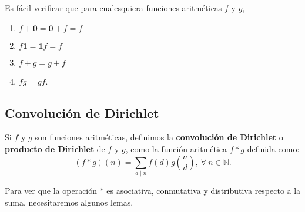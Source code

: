 Es fácil verificar que para cualesquiera funciones aritméticas $f$ y $g$,
\begin{enumerate}[label=\textnormal{(\roman*)}]
\item $f+\mathbf{0}=\mathbf{0}+f=f$ 
\item $f\mathbf{1}=\mathbf{1}f=f$ 
\item $f+g=g+f$
\item $fg=gf$.
\end{enumerate}

\subsection{Convolución de Dirichlet}

\begin{definition}
Si $f$ y $g$ son funciones aritméticas, definimos la \textbf{convolución de Dirichlet} o \textbf{producto de Dirichlet} de $f$ y $g$, como la función aritmética $f*g$ definida como:
\begin{equation*}
	(f*g)(n)=\sum_{d \mid n} f(d)g\left(\frac{n}{d}\right),\:\forall \: n\in\mathbb{N}.
\end{equation*}
\end{definition}

Para ver que la operación $*$ es asociativa, conmutativa y distributiva respecto a la suma, necesitaremos algunos lemas.

